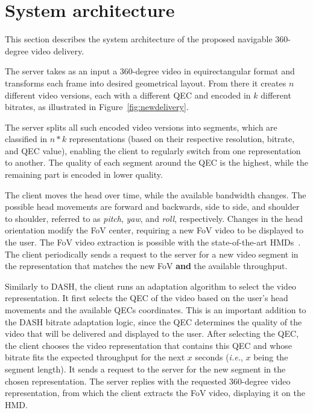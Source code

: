 \section{System architecture}

This section describes the system architecture of the proposed navigable 360-degree video delivery. %

 The server takes as an input a 360-degree video in equirectangular format and transforms each frame into desired geometrical layout. From there it creates $n$ different video versions, each with a different QEC and encoded in $k$ different bitrates, as illustrated in Figure~\ref{fig:newdelivery}. 

The server splits all such encoded video versions into segments, which are classified in $n*k$ representations (based on their respective resolution, bitrate, and QEC value), enabling the client to regularly switch from one representation to another. The quality of each segment around the QEC is the highest, while the remaining part is encoded in lower quality.

 The client moves the head over time, while the available bandwidth changes. The possible head movements are forward and backwards, side to side, and shoulder to shoulder, referred to as \emph{pitch}, \emph{yaw}, and \emph{roll}, respectively. Changes in the head orientation modify the FoV center, requiring a new FoV video to be displayed to the user. The FoV video extraction is possible with the state-of-the-art HMDs~\cite{fovhmds}. The client periodically sends a request to the server for a new video segment in the representation that matches the new FoV \textbf{and} the available throughput.

 Similarly to DASH, the client runs an adaptation algorithm to select the video representation.
It first selects the QEC of the video based on the user's head movements and the available QECs coordinates. This is an important addition to the DASH bitrate adaptation logic, since the QEC determines the quality of the video that will be delivered and displayed to the user. After selecting the QEC, the client chooses the video representation that contains this QEC and whose bitrate fits the expected throughput for the next $x$ seconds (\textit{i.e.}, $x$ being the segment length). It sends a request to the server for the new segment in the chosen representation. The server replies with the requested 360-degree video representation, from which the client extracts the FoV video, displaying it on the HMD. %


